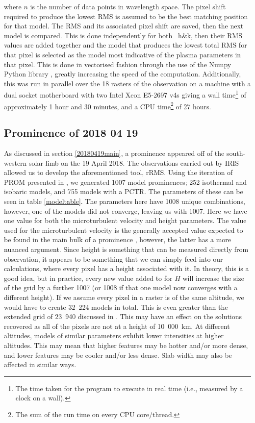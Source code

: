 where $n$ is the number of data points in wavelength space. The pixel shift required to produce the lowest RMS is assumed to be the best matching position for that model. The RMS and its associated pixel shift are saved, then the next model is compared. This is done independently for both \mgii~h\&k, then their RMS values are added together and the model that produces the lowest total RMS for that pixel is selected as the model most indicative of the plasma parameters in that pixel. This is done in vectorised fashion through the use of the Numpy Python library \citep{harris_array_2020}, greatly increasing the speed of the computation. Additionally, this was run in parallel over the 18 rasters of the observation on a machine with a dual socket motherboard with two Intel Xeon E5-2697 v4s giving a wall time\footnote{The time taken for the program to execute in real time (i.e., measured by a clock on a wall).} of approximately 1 hour and 30 minutes, and a CPU time\footnote{The sum of the run time on every CPU core/thread.} of 27 hours.

\subsection{Prominence of 2018 04 19}
\label{20180419}
As discussed in section \ref{20180419main}, a prominence appeared off of the south-western solar limb on the 19 April 2018. The observations carried out by IRIS allowed us to develop the aforementioned tool, rRMS. Using the iteration of PROM presented in \cite{levens_modelling_2019}, we generated 1007 model prominences; 252 isothermal and isobaric models, and 755 models with a PCTR. The parameters of these can be seen in table \ref{modeltable}. The parameters here have 1008 unique combinations, however, one of the models did not converge, leaving us with 1007. Here we have one value for both the microturbulent velocity and height parameters. The value used for the microturbulent velocity is the generally accepted value expected to be found in the main bulk of a prominence \citep{labrosse_physics_2010}, however, the latter has a more nuanced argument. Since height is something that can be measured directly from observation, it appears to be something that we can simply feed into our calculations, where every pixel has a height associated with it. In theory, this is  a good idea, but in practice, every new value added to for $H$ will increase the size of the grid by a further 1007 (or 1008 if that one model now converges with a different height). If we assume every pixel in a raster is of the same altitude, we would have to create 32~224 models in total. This is even greater than the extended grid of 23~940 discussed in . This may have an effect on the solutions recovered as all of the pixels are not at a height of 10~000~km. At different altitudes, models of similar parameters exhibit lower intensities at higher altitudes. This may mean that higher features may be hotter and/or more dense, and lower features may be cooler and/or less dense. Slab width may also be affected in similar ways.


